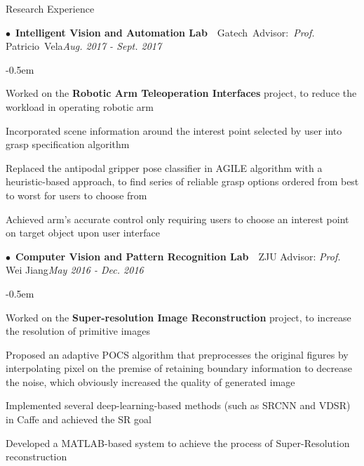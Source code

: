 \documentclass{resume} %
\begin{document}

\begin{rSection}{Research Experience}


\begin{spacing}{0.4}
$\bullet$~{\bf Intelligent Vision and Automation Lab}~~{Gatech~Advisor:~{\em Prof.} Patricio~Vela}\hfill{\em Aug. 2017 - Sept. 2017}\smallskip\\
\end{spacing}
\begin{list}{--}{\leftmargin=1em}
	\itemsep -0.5em \vspace{-0.5em}
\item Worked on the {\bfseries Robotic Arm Teleoperation Interfaces} project, to reduce the workload in operating robotic arm
\item Incorporated scene information around the interest point selected by user into grasp specification algorithm
\item Replaced the antipodal gripper pose classifier in AGILE algorithm with a heuristic-based approach, to find series of reliable grasp options ordered from best to worst for users to choose from
\item Achieved arm's accurate control only requiring users to choose an interest point on target object upon user interface
	
\end{list}



\begin{spacing}{0.4}
$\bullet$~{\bf Computer Vision and Pattern Recognition Lab}~~{ZJU Advisor: {\em Prof.} Wei Jiang}\hfill{\em May 2016 - Dec. 2016}\smallskip\\
\end{spacing}
\begin{list}{--}{\leftmargin=1em}
	\itemsep -0.5em \vspace{-0.5em}
\item Worked on the {\bfseries Super-resolution Image Reconstruction} project, to increase the resolution of primitive images
\item Proposed an adaptive POCS algorithm that preprocesses the original figures by interpolating pixel on the premise of retaining boundary information to decrease the noise, which obviously increased the quality of generated image
\item Implemented several deep-learning-based methods (such as SRCNN and VDSR) in Caffe and achieved the SR goal
\item Developed a MATLAB-based system to achieve the process of Super-Resolution reconstruction
\end{list}


\end{rSection}
\end{document}
